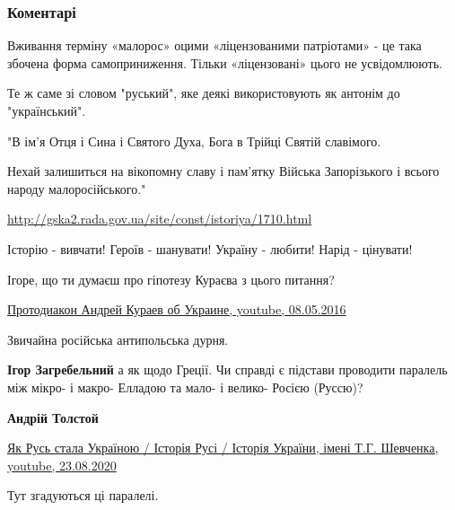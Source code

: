  
 
 
 
 
\subsubsection{Коментарі}

\begin{itemize} %
Вживання терміну «малорос» оцими «ліцензованими патріотами» - це така збочена форма самоприниження. Тільки «ліцензовані» цього не усвідомлюють.

Те ж саме зі словом "руський", яке деякі використовують як антонім до "український".


"В ім'я Отця і Сина і Святого Духа, Бога в Трійці Святій славімого.

Нехай залишиться на вікопомну славу і пам'ятку Війська Запорізького і всього
народу малоросійського." 

\url{http://gska2.rada.gov.ua/site/const/istoriya/1710.html}

Історію - вивчати!
Героїв - шанувати!
Україну - любити!
Нарід - цінувати!

Ігоре, що ти думаєш про гіпотезу Кураєва з цього питання?

\href{https://www.youtube.com/watch?v=8ehI9YcuRoU}{%
Протодиакон Андрей Кураев об Украине, youtube, 08.05.2016%
}

\begin{itemize} %
Звичайна російська антипольська дурня.

\textbf{Ігор Загребельний} а як щодо Греції. Чи справді є підстави проводити
паралель між мікро- і макро- Елладою та мало- і велико- Росією (Руссю)?

\textbf{Андрій Толстой} 

\href{https://youtu.be/5Zna0WTzFtY}{%
Як Русь стала Україною / Історія Русі / Історія України, імені Т.Г. Шевченка, youtube, 23.08.2020%
}

Тут згадуються ці паралелі.


\end{itemize}
\end{itemize}
